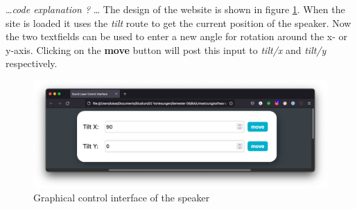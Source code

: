 \dots \textit{code explanation ?} \dots\p
%
The design of the website is shown in figure \ref{fig:software:mov:website}. When the site is loaded it uses the \textit{tilt} route to get the current position of the speaker. Now the two textfields can be used to enter a new angle for rotation around the x- or y-axis. Clicking on the \textbf{move} button will post this input to \textit{tilt/x} and \textit{tilt/y} respectively.
%
\begin{figure}[ht]
  \centering
  \includegraphics[height=\smallheight]{src/assets/pictures/software/control_interface_xl.png}
  \caption{Graphical control interface of the speaker}\label{fig:software:mov:website}
\end{figure}